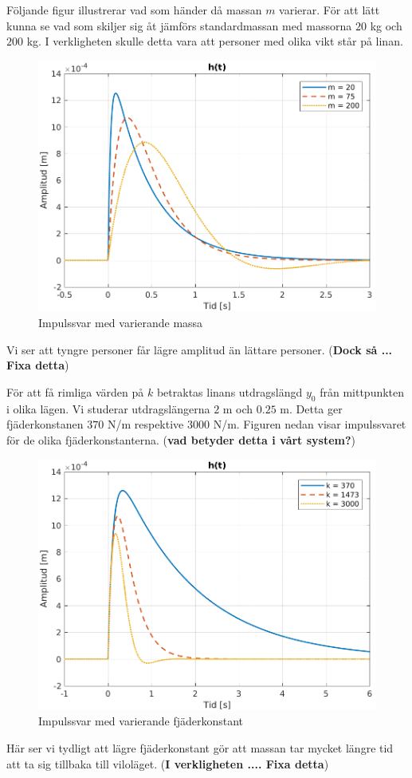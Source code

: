 \newpage
Följande figur illustrerar vad som händer då massan $m$ varierar. För att lätt kunna se vad som skiljer sig åt jämförs standardmassan med massorna $20$ kg och $200$ kg. I verkligheten skulle detta vara att personer med olika vikt står på linan.
\begin{figure}[H]
    \centering
    \includegraphics[scale=0.9]{bilder/impulssvar_variation_m}
    \caption{Impulssvar med varierande massa}
    \label{fig:impulssvar_variation_m}
\end{figure}
Vi ser att tyngre personer får lägre amplitud än lättare personer. (\textbf{Dock så ... Fixa detta})

\newpage
För att få rimliga värden på $k$ betraktas linans utdragslängd $y_0$ från mittpunkten i olika lägen. Vi studerar utdragslängerna $2$ m och $0.25$ m. Detta ger fjäderkonstanen $370$ N/m respektive $3000$ N/m. Figuren nedan visar impulssvaret för de olika fjäderkonstanterna. (\textbf{vad betyder detta i vårt system?})
\begin{figure}[H] 
    \centering
    \includegraphics[scale=0.9]{bilder/impulssvar_variation_k}
    \caption{Impulssvar med varierande fjäderkonstant}
    \label{fig:impulssvar_variation_k}
\end{figure}
Här ser vi tydligt att lägre fjäderkonstant gör att massan tar mycket längre tid att ta sig tillbaka till viloläget. (\textbf{I verkligheten .... Fixa detta})

